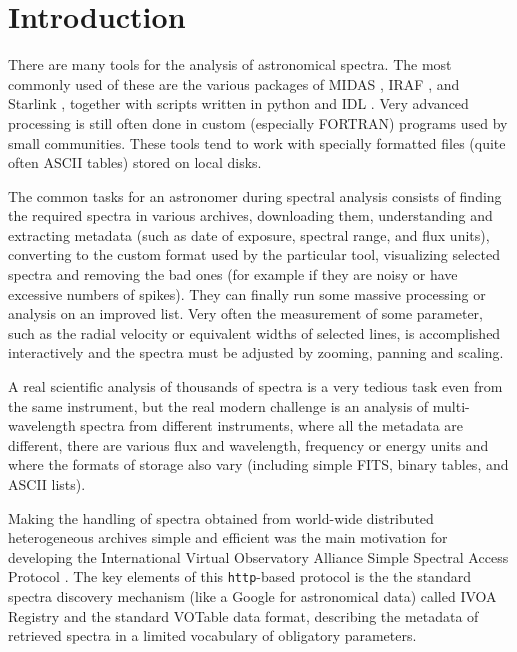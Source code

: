 \documentclass[final,authoryear,5p,times,twocolumn]{elsarticle}
\begin{document}

\newcommand{\qjras}{QJRAS}
\newcommand{\apj}{ApJ}
\newcommand{\aap}{A\&A}
\newcommand{\aspconf}{ASP Conf.\ Ser.}

\newcommand{\ascl}[1]{\href{http://www.ascl.net/#1}{ascl:#1}}

\section{Introduction}

There are many tools for the analysis of astronomical spectra.  The most
commonly used of these are the various packages of MIDAS
\citep[][\ascl{1302.017}]{1992ASPC...25..115W}, IRAF
\citep[][\ascl{9911.002}]{2012ASPC..461..595F}, and Starlink
\citep[][\ascl{1110.012}]{1982QJRAS..23..485D}, together with scripts
written in python \citep[e.g.,][]{2013A&A...558A..33A} and IDL \citep[e.g.,][]{1993ASPC...52..246L}.
Very advanced processing is still often done in custom
(especially FORTRAN) programs used by small communities.  These tools tend to
work with specially formatted files (quite often ASCII tables) stored on local
disks.

The common tasks for an astronomer during spectral analysis consists of finding
the required spectra in various archives, downloading them, understanding and
extracting metadata (such as date of exposure, spectral range, and flux units),
converting to the custom format used by the particular tool, visualizing
selected spectra and  removing the bad ones (for example if they are
noisy or have excessive numbers of spikes). They can finally
run some massive processing or analysis on an
improved list.  Very often the measurement of some parameter, such as the radial
velocity or equivalent widths of selected lines, is accomplished interactively
and the spectra must be adjusted by zooming, panning and scaling.

A real scientific analysis of thousands of spectra is a very
tedious task even from the same instrument, but the real modern challenge is an
analysis of multi-wavelength spectra from different instruments, where all the
metadata are different, there are various flux and wavelength, frequency or
energy units  and where the formats of storage also vary (including simple FITS, binary
tables, and ASCII lists).

Making the handling of spectra obtained from world-wide distributed
heterogeneous archives simple and efficient was the main motivation for
developing the International Virtual Observatory Alliance Simple Spectral
Access Protocol \citep[IVOA SSAP;][]{ssap}. The key elements of this
\texttt{http}-based protocol is the the standard spectra discovery mechanism (like a
Google for astronomical data) called IVOA Registry \citep{registry} and  the
standard VOTable data format\citep{2004tivo.conf..118O},
describing the metadata of retrieved spectra in a limited vocabulary of
obligatory parameters.
\end{document}

